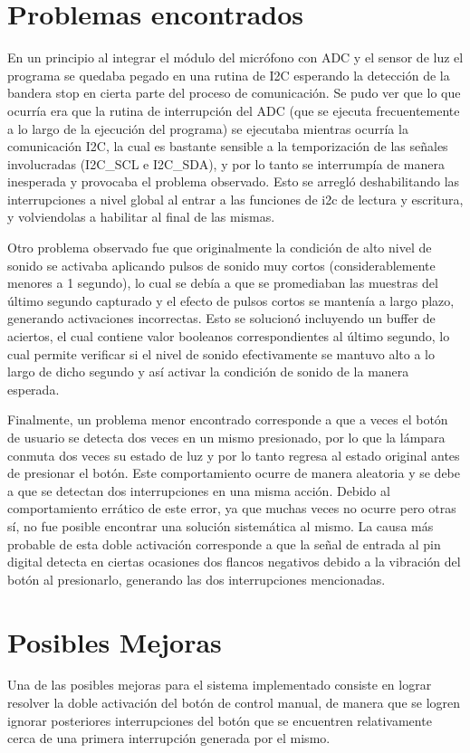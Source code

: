 \section{Problemas encontrados}
En un principio al integrar el módulo del micrófono con ADC y el sensor de luz el programa se
quedaba pegado en una rutina de I2C esperando la detección de la bandera stop en cierta parte del
proceso de comunicación. Se pudo ver que lo que ocurría era que la rutina de interrupción del ADC
(que se ejecuta frecuentemente a lo largo de la ejecución del programa) se ejecutaba mientras
ocurría la comunicación I2C, la cual es bastante sensible a la temporización de las señales
involucradas (I2C\_SCL e I2C\_SDA), y por lo tanto se interrumpía de manera inesperada y provocaba
el problema observado. Esto se arregló deshabilitando las interrupciones a nivel global al entrar a
las funciones de i2c de lectura y escritura, y volviendolas a habilitar al final de las mismas.

Otro problema observado fue que originalmente la condición de alto nivel de sonido se activaba
aplicando pulsos de sonido muy cortos (considerablemente menores a 1 segundo), lo cual se debía a
que se promediaban las muestras del último segundo capturado y el efecto de pulsos cortos se
mantenía a largo plazo, generando activaciones incorrectas. Esto se solucionó incluyendo un buffer
de aciertos, el cual contiene valor booleanos correspondientes al último segundo, lo cual permite
verificar si el nivel de sonido efectivamente se mantuvo alto a lo largo de dicho segundo y así
activar la condición de sonido de la manera esperada.

Finalmente, un problema menor encontrado corresponde a que a veces el botón de usuario se detecta dos
veces en un mismo presionado, por lo que la lámpara conmuta dos veces su estado de luz y por lo
tanto regresa al estado original antes de presionar el botón. Este comportamiento ocurre de manera
aleatoria y se debe a que se detectan dos interrupciones en una misma acción. Debido al comportamiento
errático de este error, ya que muchas veces no ocurre pero otras sí, no fue posible encontrar una
solución sistemática al mismo. La causa más probable de esta doble activación corresponde a que la
señal de entrada al pin digital detecta en ciertas ocasiones dos flancos negativos debido a la
vibración del botón al presionarlo, generando las dos interrupciones mencionadas.


\newpage
\section{Posibles Mejoras}
Una de las posibles mejoras para el sistema implementado consiste en lograr resolver la doble
activación del botón de control manual, de manera que se logren ignorar posteriores interrupciones
del botón que se encuentren relativamente cerca de una primera interrupción generada por el mismo.

\newpage


%
%
